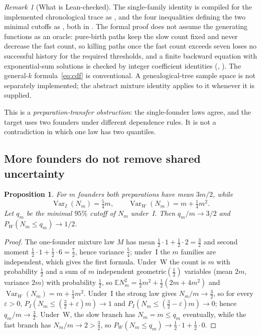 \documentclass[11pt,a4paper]{article}
\theoremstyle{plain}
\newtheorem{proposition}[theorem]{Proposition}
\theoremstyle{definition}
\theoremstyle{remark}
\newtheorem{remark}[theorem]{Remark}
\newcommand{\EE}{\mathbb E}
\newcommand{\Var}{\operatorname{Var}}
\begin{document}
\begin{remark}[What is Lean-checked]\label{rem:leanamb}
The single-family identity is compiled for the implemented chronological trace as , and the four inequalities defining the two minimal cutoffs as , both in . The formal proof does not assume the generating functions as an oracle: pure-birth paths keep the slow count fixed and never decrease the fast count, so killing paths once the fast count exceeds seven loses no successful history for the required thresholds, and a finite backward equation with exponential-sum solutions is checked by integer coefficient identities (, ). The general-$k$ formula~\eqref{eq:cdf} is conventional. A genealogical-tree sample space is not separately implemented; the abstract mixture identity applies to it whenever it is supplied.
\end{remark}

This is a \emph{preparation-transfer obstruction}: the single-founder laws agree, and the target uses two founders under different dependence rules. It is not a contradiction in which one law has two quantiles.

\subsection{More founders do not remove shared uncertainty}
\begin{proposition}\label{prop:many}
For $m$ founders both preparations have mean $3m/2$, while
\begin{equation}\label{eq:var}
\Var_I(N_m)=\tfrac54m,\qquad \Var_W(N_m)=m+\tfrac14m^2 .
\end{equation}
Let $q_m$ be the minimal $95\%$ cutoff of $N_m$ under~I. Then $q_m/m\to3/2$ and $P_W(N_m\le q_m)\to1/2$.
\end{proposition}

\begin{proof}
The one-founder mixture law $M$ has mean $\tfrac12\cdot1+\tfrac12\cdot2=\tfrac32$ and second moment $\tfrac12\cdot1+\tfrac12\cdot6=\tfrac72$, hence variance $\tfrac54$; under~I the $m$ families are independent, which gives the first formula. Under~W the count is $m$ with probability $\tfrac12$ and a sum of $m$ independent geometric$(\tfrac12)$ variables (mean $2m$, variance $2m$) with probability $\tfrac12$, so $\EE N_m^2=\tfrac12m^2+\tfrac12(2m+4m^2)$ and $\Var_W(N_m)=m+\tfrac14m^2$. Under~I the strong law gives $N_m/m\to\tfrac32$, so for every $\varepsilon>0$, $P_I(N_m\le(\tfrac32+\varepsilon)m)\to1$ and $P_I(N_m\le(\tfrac32-\varepsilon)m)\to0$; hence $q_m/m\to\tfrac32$. Under~W, the slow branch has $N_m=m\le q_m$ eventually, while the fast branch has $N_m/m\to2>\tfrac32$, so $P_W(N_m\le q_m)\to\tfrac12\cdot1+\tfrac12\cdot0$.
\end{proof}
\end{document}

